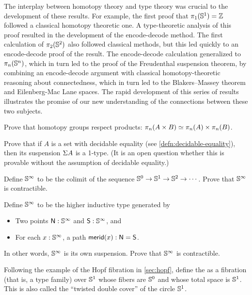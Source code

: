 The interplay between homotopy theory and type theory was crucial to the
development of these results.  For example, the first proof that
$\pi_1(\mathbb{S} ^1)=\mathbb{Z}$ followed a classical homotopy theoretic one.  A
type-theoretic analysis of this proof resulted in the development of the
encode-decode method.  The first calculation of $\pi_2(\mathbb{S} ^2)$ also followed
classical methods, but this led quickly to an encode-decode proof of the
result.  The encode-decode calculation generalized to $\pi_n(\mathbb{S} ^n)$, which
in turn led to the proof of the Freudenthal suspension theorem, by
combining an encode-decode argument with classical homotopy-theoretic
reasoning about connectedness, which in turn led to the Blakers--Massey
theorem and Eilenberg-Mac Lane spaces.  The rapid development of this
series of results illustrates the promise of our new understanding of
the connections between these two subjects.

\sectionExercises

\begin{ex}
  Prove that homotopy groups respect products: $\pi_n(A\times B) \simeq \pi_n(A)\times \pi_n(B)$.
\end{ex}

\begin{ex}
  Prove that if $A$ is a set with decidable equality (see \autoref{defn:decidable-equality}), then its suspension $\Sigma A$ is a 1-type.
  (It is an open question whether this is provable without the assumption of decidable equality.)
\end{ex}

\begin{ex}
  Define $\mathbb{S}^\infty$ to be the colimit of the sequence $\mathbb{S}^0 \to \mathbb{S}^1 \to \mathbb{S}^2 \to\cdots$.
  Prove that $\mathbb{S}^\infty$ is contractible.
\end{ex}

\begin{ex}
  Define $\mathbb{S}^\infty$ to be the higher inductive type generated by
  \begin{itemize}
  \item Two points $\mathsf{N}:\mathbb{S}^\infty$ and $\mathsf{S}:\mathbb{S}^\infty$, and
  \item For each $x:\mathbb{S}^\infty$, a path $\mathsf{merid}(x):\mathsf{N}=\mathsf{S}$.
  \end{itemize}
  In other words, $\mathbb{S}^\infty$ is its own suspension.
  Prove that $\mathbb{S}^\infty$ is contractible.
\end{ex}

\begin{ex}\label{ex:HopfJr}
  Following the example of the Hopf fibration in \autoref{sec:hopf}, define the 
as a fibration (that is, a type family) over $\mathbb{S} ^1$ whose fibers are $\mathbb{S} ^0$ and whose total space is $\mathbb{S} ^1$.  This is also called the ``twisted double cover'' of the circle $\mathbb{S} ^1$.
\end{ex}

